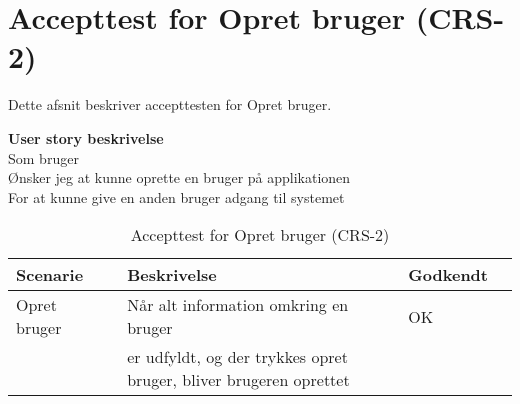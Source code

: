 \section{Accepttest for Opret bruger (CRS-2)}
Dette afsnit beskriver accepttesten for Opret bruger.

\textbf{User story beskrivelse} \\
Som bruger \\
Ønsker jeg at kunne oprette en bruger på applikationen \\
For at kunne give en anden bruger adgang til systemet

\begin{table}[H]
	\centering
	\begin{tabular}{|ll|l|ll|} \hline
		\textbf{Scenarie} &  & \textbf{Beskrivelse}&  \textbf{Godkendt}&  \\ \hline
		Opret bruger&  &  Når alt information omkring en bruger &  OK&  \\
		& & er udfyldt, og der trykkes opret bruger, bliver brugeren oprettet& & \\ \hline
	\end{tabular}
	\caption{Accepttest for Opret bruger (CRS-2)}
	\label{AcceptOpretBruger}
\end{table}

\clearpage